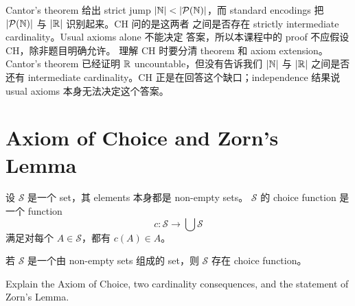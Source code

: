 \begin{explanation}
Cantor's theorem 给出 strict jump \(\left|\mathbb{N}\right|<\left|\mathcal{P}(\mathbb{N})\right|\)，而 standard
encodings 把 \(\left|\mathcal{P}(\mathbb{N})\right|\) 与 \(\left|\mathbb{R}\right|\) 识别起来。CH 问的是这两者
之间是否存在 strictly intermediate cardinality。Usual axioms alone 不能决定
答案，所以本课程中的 proof 不应假设 CH，除非题目明确允许。
理解 CH 时要分清 theorem 和 axiom extension。Cantor's theorem 已经证明
\(\mathbb{R}\) uncountable，但没有告诉我们 \(\left|\mathbb{N}\right|\) 与 \(\left|\mathbb{R}\right|\) 之间是否
还有 intermediate cardinality。CH 正是在回答这个缺口；independence 结果说
usual axioms 本身无法决定这个答案。
\end{explanation}

\section{Axiom of Choice and Zorn's Lemma \optional}

\begin{definition}
设 \(\mathcal S\) 是一个 set，其 elements 本身都是 non-empty sets。
\(\mathcal S\) 的 choice function 是一个 function
\[
  c:\mathcal S\to\bigcup\mathcal S
\]
满足对每个 \(A\in\mathcal S\)，都有 \(c(A)\in A\)。
\end{definition}

\begin{theorem}
若 \(\mathcal S\) 是一个由 non-empty sets 组成的 set，则 \(\mathcal S\)
存在 choice function。
\end{theorem}

\begin{exerciseblock}
Explain the Axiom of Choice, two cardinality consequences, and the statement of
Zorn's Lemma.
\end{exerciseblock}

